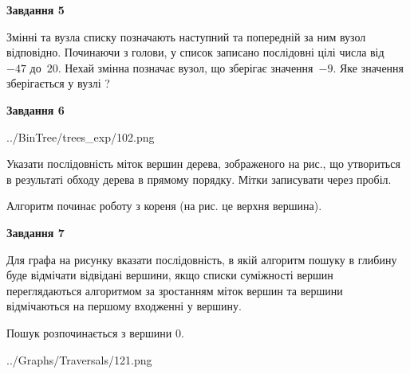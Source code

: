 \documentclass[12pt, ukrainian]{article}
\begin{document}
{\begin {large}
{\begin {center}\textbf{Завдання 5}\end {center}}\par
Змінні  та  вузла списку позначають наступний та попередній за ним вузол відповідно. Починаючи з голови, у список записано послідовні цілі числа від~$-47$ до~$20$. Нехай змінна  позначає вузол, що зберігає значення~$-9$.
Яке значення зберігається у вузлі  ?\par
\newpage

{\begin {center}\textbf{Завдання 6}\end {center}}\par

\begin{center}
	{../BinTree/trees_exp/102.png}
\end{center}
Указати послідовність міток вершин дерева, зображеного на рис., що утвориться в результаті обходу дерева в прямому порядку. Мітки записувати через пробіл.\par Алгоритм починає роботу з кореня (на рис. це верхня вершина).\par
\newpage

{\begin {center}\textbf{Завдання 7}\end {center}}\par
Для графа на рисунку вказати послідовність, в якій алгоритм пошуку в глибину буде відмічати відвідані вершини, якщо списки суміжності вершин переглядаються алгоритмом за зростанням міток вершин та вершини відмічаються на першому вход\-женні у вершину.\par
Пошук розпочинається з вершини 0.\par

\begin{center}
	{../Graphs/Traversals/121.png}
\end{center}\par
\newpage


\end{large}}
\end{document}
